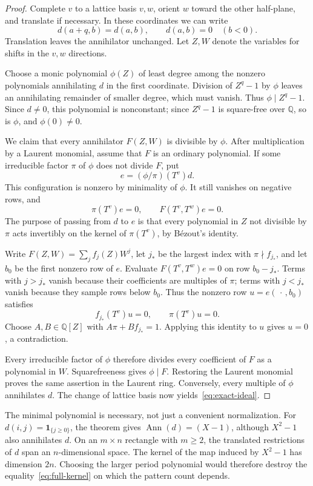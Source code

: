 \documentclass[11pt,a4paper,reqno]{amsart}
\theoremstyle{remark}
\newcommand{\Q}{\mathbb Q}
\DeclareMathOperator{\Ann}{Ann}
\numberwithin{equation}{section}
\begin{document}
\begin{proof}
Complete $v$ to a lattice basis $v,w$, orient $w$ toward the other half-plane, and translate if necessary. In these coordinates we can write
\[
 d(a+q,b)=d(a,b),\qquad d(a,b)=0\quad(b<0).
\]
Translation leaves the annihilator unchanged. Let $Z,W$ denote the variables for shifts in the $v,w$ directions.

Choose a monic polynomial $\phi(Z)$ of least degree among the nonzero polynomials annihilating $d$ in the first coordinate. Division of $Z^q-1$ by $\phi$ leaves an annihilating remainder of smaller degree, which must vanish. Thus $\phi\mid Z^q-1$. Since $d\ne0$, this polynomial is nonconstant; since $Z^q-1$ is square-free over $\Q$, so is $\phi$, and $\phi(0)\ne0$.

We claim that every annihilator $F(Z,W)$ is divisible by $\phi$. After multiplication by a Laurent monomial, assume that $F$ is an ordinary polynomial. If some irreducible factor $\pi$ of $\phi$ does not divide $F$, put
\[
 e=(\phi/\pi)(T^v)d.
\]
This configuration is nonzero by minimality of $\phi$. It still vanishes on negative rows, and
\[
 \pi(T^v)e=0,\qquad F(T^v,T^w)e=0.
\]
The purpose of passing from $d$ to $e$ is that every polynomial in $Z$ not divisible by $\pi$ acts invertibly on the kernel of $\pi(T^v)$, by B\'ezout's identity.

Write $F(Z,W)=\sum_j f_j(Z)W^j$, let $j_*$ be the largest index with $\pi\nmid f_{j_*}$, and let $b_0$ be the first nonzero row of $e$. Evaluate $F(T^v,T^w)e=0$ on row $b_0-j_*$. Terms with $j>j_*$ vanish because their coefficients are multiples of $\pi$; terms with $j<j_*$ vanish because they sample rows below $b_0$. Thus the nonzero row $u=e(\,\cdot\,,b_0)$ satisfies
\[
 f_{j_*}(T^v)u=0,\qquad \pi(T^v)u=0.
\]
Choose $A,B\in\Q[Z]$ with $A\pi+Bf_{j_*}=1$. Applying this identity to $u$ gives $u=0$, a contradiction.

Every irreducible factor of $\phi$ therefore divides every coefficient of $F$ as a polynomial in $W$. Squarefreeness gives $\phi\mid F$. Restoring the Laurent monomial proves the same assertion in the Laurent ring. Conversely, every multiple of $\phi$ annihilates $d$. The change of lattice basis now yields~\eqref{eq:exact-ideal}.
\end{proof}

The minimal polynomial is necessary, not just a convenient normalization. For
$d(i,j)=\mathbf1_{\{j\ge0\}}$, the theorem gives $\Ann(d)=(X-1)$, although $X^2-1$ also annihilates $d$. On an $m\times n$ rectangle with $m\ge2$, the translated restrictions of $d$ span an $n$-dimensional space. The kernel of the map induced by $X^2-1$ has dimension $2n$. Choosing the larger period polynomial would therefore destroy the equality~\eqref{eq:full-kernel} on which the pattern count depends.
\end{document}
